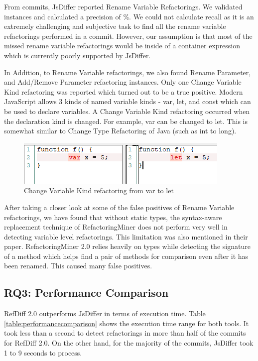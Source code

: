 \documentclass[letterpaper,12pt,onecolumn,final]{report}
\begin{document}
From \evTotalCommits{} commits, JsDiffer reported \renameVarTotalCount{} Rename Variable Refactorings. We validated \renameVarValidatedCount{} instances and calculated a precision of \renameVarPrecision{}\%.
We could not calculate recall as it is an extremely challenging and subjective task to find all the rename variable refactorings performed in a commit. However, our assumption is that most of the missed rename variable refactorings would be inside of a container expression which is currently poorly supported by JsDiffer.

In Addition, to Rename Variable refactorings, we also found Rename Parameter, and Add/Remove Parameter refactoring instances. Only one Change Variable Kind refactoring was reported which turned out to be a true positive. Modern JavaScript allows 3 kinds of named variable kinds - var, let, and const which can be used to declare variables. A Change Variable Kind refactoring occurred when the declaration kind is changed. For example, var can be changed to let. This is somewhat similar to Change Type Refactoring of Java (such as int to long).

\begin{figure}
\centering
\includegraphics[width=0.5\linewidth]{images/change_var_kind}
  \caption{Change Variable Kind refactoring from var to let}
   \label{fig:extractToggle}
\end{figure}

After taking a closer look at some of the false positives of Rename Variable refactorings, we have found that without static types, the syntax-aware replacement technique of RefactoringMiner does not perform very well in detecting variable level refactorings. This limitation was also mentioned in their paper. RefactoringMiner 2.0 relies heavily on types while detecting the signature of a method which helps find a pair of methods for comparison even after it has been renamed. This caused many false positives.


\subsection{RQ3: Performance Comparison}

RefDiff 2.0 outperforms JsDiffer in terms of execution time. Table \ref{table:performancecomparison} shows the execution time range for both tools. It took less than a second to detect refactorings in more than half of the commits for RefDiff 2.0. On the other hand, for the majority of the commits, JsDiffer took 1 to 9 seconds to process.
\end{document}

